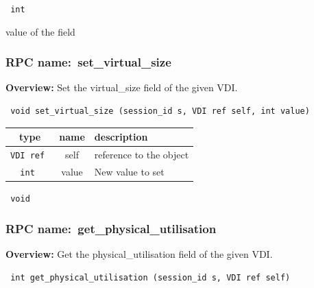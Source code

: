 \vspace{0.3cm}

{\tt 
int
}


value of the field
\vspace{0.3cm}
\vspace{0.3cm}
\vspace{0.3cm}
\subsubsection{RPC name:~set\_virtual\_size}

{\bf Overview:} 
Set the virtual\_size field of the given VDI.

\begin{verbatim} void set_virtual_size (session_id s, VDI ref self, int value)\end{verbatim}



 
\vspace{0.3cm}
\begin{tabular}{|c|c|p{7cm}|}
 \hline
{\bf type} & {\bf name} & {\bf description} \\ \hline
{\tt VDI ref } & self & reference to the object \\ \hline 

{\tt int } & value & New value to set \\ \hline 

\end{tabular}

\vspace{0.3cm}

{\tt 
void
}



\vspace{0.3cm}
\vspace{0.3cm}
\vspace{0.3cm}
\subsubsection{RPC name:~get\_physical\_utilisation}

{\bf Overview:} 
Get the physical\_utilisation field of the given VDI.

\begin{verbatim} int get_physical_utilisation (session_id s, VDI ref self)\end{verbatim}


